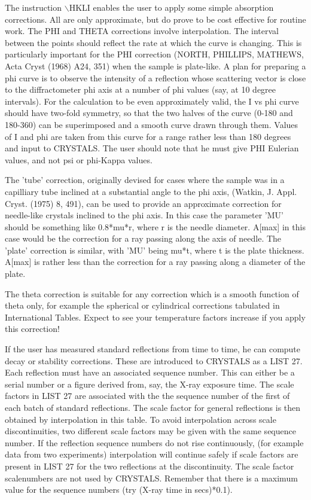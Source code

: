 \documentclass[10pt,a4paper]{report}
\begin{document}
The instruction $\backslash$HKLI enables the user to apply some simple absorption 
 corrections. All are only approximate, but do prove to be cost effective 
 for routine work. The PHI and THETA corrections involve interpolation. The 
 interval between  the points should reflect the rate at which the curve
 is changing. This is particularly important for the PHI correction (NORTH,
 PHILLIPS, MATHEWS, Acta Cryst (1968) A24, 351) when the sample is plate-like.
 A plan for preparing a phi curve is to observe the intensity of a reflection
 whose scattering vector is close to the diffractometer phi axis at a number
 of phi values (say, at 10 degree intervals). For the calculation to be even
 approximately valid, the I vs phi curve should have two-fold symmetry, so
 that the two halves of the curve (0-180 and 180-360) can be superimposed
 and a smooth curve drawn through them. Values of I and phi are taken from this
 curve for a range rather less than 180 degrees and input to CRYSTALS.
 The user should note that he must give PHI 
 Eulerian values, and not psi or phi-Kappa values.


The 'tube' correction, originally devised for cases where the sample was
 in a capilliary tube inclined at a substantial angle to the phi axis,
 (Watkin, J. Appl. Cryst. (1975) 8, 491),
 can be used to provide an approximate correction for needle-like crystals
 inclined to the phi axis. In this case the parameter 'MU' should be something
 like 0.8*mu*r, where r is the needle diameter. A[max] in this case would be
 the correction for a ray passing along the axis of needle. The 'plate'
 correction is similar, with 'MU' being mu*t, where t is the plate 
 thickness. A[max] is rather less than the correction for a ray passing along 
 a diameter of the plate.


The theta correction is suitable for any correction which is a smooth
 function of theta only, for example the spherical or cylindrical corrections
 tabulated in International Tables. Expect to see your temperature factors
 increase if you apply this correction!


If the user has measured standard reflections from time to time, he can 
 compute decay or stability corrections. These are introduced to CRYSTALS as 
 a LIST 27. Each reflection must have an associated sequence number.
 This can either be a serial number or a figure derived from, say, the X-ray
 exposure time. 
 The scale factors in LIST 27 are associated with the the sequence
 number of the first of each batch of standard reflections. The scale factor
 for general reflections is then obtained by interpolation in this table.
 To avoid interpolation across scale discontinuities, two different scale
 factors may be given with the same sequence number. If the reflection sequence
 numbers do not rise continuously, (for example data from two experiments)
 interpolation will continue safely if scale factors are present in LIST 27
 for the two reflections at the discontinuity. The scale factor scalenumbers
 are not used by CRYSTALS. Remember that there is a maximum value for
 the sequence numbers (try (X-ray time in secs)*0.1). 
\end{document}
